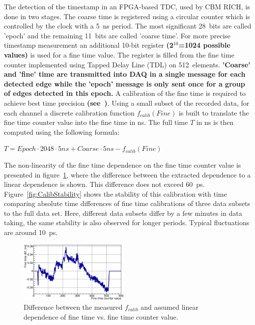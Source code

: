 \documentclass[final,5p,times,twocolumn]{elsarticle}
\begin{document}
The detection of the timestamp in an FPGA-based TDC, used by CBM RICH, is done in two stages. The coarse time is registered using a circular counter which is controlled by the clock with a 5~ns period. The most significant 28~bits are called 'epoch' and the remaining 11~bits are called 'coarse time'. For more precise timestamp measurement an additional 10-bit register \textbf{(2$^{10}$=1024 possible values)} is used for a fine time value. The register is filled from the fine time counter implemented using Tapped Delay Line (TDL) on 512~elements.
\textbf{'Coarse' and 'fine' time are transmitted into DAQ in a single message for each detected edge while the 'epoch' message is only sent once for a group of edges detected in this epoch.}
A calibration of the fine time is required to achieve best time precision \textbf{(see~\cite{FINECALIB})}. Using a small subset of the recorded data, for each channel a discrete calibration function $ f_{calib}(Fine) $ is built to translate the fine time counter value into the fine time in ns. The full time $ T $ in ns is then computed using the following formula:

{\centering
$ T = Epoch \cdot 2048 \cdot 5ns + Coarse \cdot 5ns - f_{calib}(Fine) $ \\
}

The non-linearity of the fine time dependence on the fine time counter value is presented in figure~\ref{fig:CalibTableMinusLinear}, where the difference between the extracted dependence to a linear dependence is shown. This difference does not exceed 60~ps. Figure~\ref{fig:CalibStability} shows the stability of this calibration with time comparing absolute time differences of fine time calibrations of three data subsets to the full data set. Here, different data subsets differ by a few minutes in data taking, the same stability is also observed for longer periods. Typical fluctuations are around 10~ps.

\begin{figure}[h]
	\centering
	\includegraphics[width=0.48\textwidth]{figures/CalTableMinusFit_0010_01_feb2017.eps}
	\caption{Difference between the measured $ f_{calib} $ and assumed linear dependence of fine time vs. fine time counter value.}
	\label{fig:CalibTableMinusLinear}
\end{figure}
\end{document}

